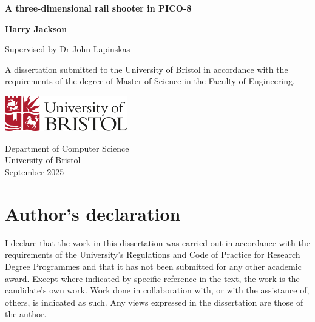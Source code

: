 \documentclass[11pt]{article}
\begin{document}

\begin{titlepage}
   \begin{center}
       \vspace*{1cm}

       \huge
       \textbf{A three-dimensional rail shooter in PICO-8}

       \vspace{1.5cm}

       \large
       \textbf{Harry Jackson}

       \vspace{0.5cm}

       Supervised by Dr John Lapinskas

       \vfill
            
       A dissertation submitted to the University of Bristol in accordance
       with the requirements of the degree of Master of Science in
       the Faculty of Engineering.
            
       \vspace{0.8cm}
     
       \includegraphics[width=0.4\textwidth]{university}

       \vspace{0.8cm}
            
       Department of Computer Science\\
       University of Bristol\\
       September 2025\\
            
   \end{center}
\end{titlepage}

\section*{Author's declaration}

\vspace{0.5cm}

I declare that the work in this dissertation was carried out in accordance with the
requirements of the University’s Regulations and Code of Practice for Research
Degree Programmes and that it has not been submitted for any other academic
award. Except where indicated by specific reference in the text, the work is the
candidate’s own work. Work done in collaboration with, or with the assistance of,
others, is indicated as such. Any views expressed in the dissertation are those of the
author.
\end{document}

